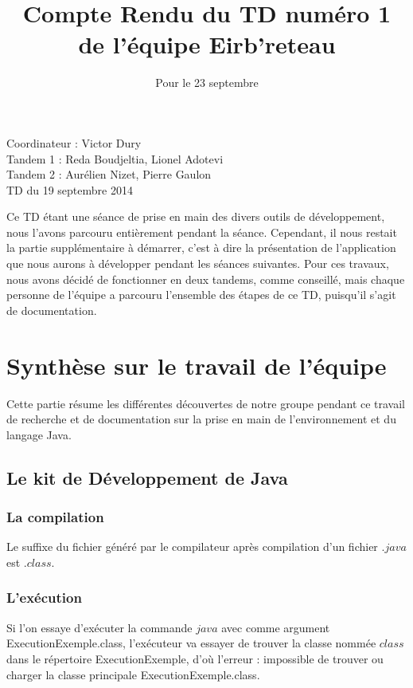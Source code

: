 \documentclass[a4paper,11pts]{article}
\begin{document}
\title{Compte Rendu du TD numéro 1 de l'équipe Eirb'reteau}
\date{Pour le 23 septembre}
\maketitle

\begin{center}
Coordinateur : Victor Dury\\
Tandem 1 : Reda Boudjeltia, Lionel Adotevi\\
Tandem 2 : Aurélien Nizet, Pierre Gaulon\\
TD du 19 septembre 2014
\end{center}

Ce TD étant une séance de prise en main des divers outils de développement, nous l'avons parcouru entièrement pendant la séance. Cependant, il nous restait la partie supplémentaire à démarrer, c'est à dire la présentation de l'application que nous aurons à développer pendant les séances suivantes. Pour ces travaux, nous avons décidé de fonctionner en deux tandems, comme conseillé, mais chaque personne de l'équipe a parcouru l'ensemble des étapes de ce TD, puisqu'il s'agit de documentation.

\section{Synthèse sur le travail de l'équipe}
Cette partie résume les différentes découvertes de notre groupe pendant ce travail de recherche et de documentation sur la prise en main de l'environnement et du langage Java.

\subsection{Le kit de Développement de Java}
\subsubsection{La compilation}
\indent Le suffixe du fichier généré par le compilateur après compilation d'un fichier $.java$ est $.class$.

\subsubsection{L'exécution}
\indent Si l'on essaye d'exécuter la commande $java$ avec comme argument ExecutionExemple.class, l'exécuteur va essayer de trouver la classe nommée $class$ dans le répertoire ExecutionExemple, d'où l'erreur : impossible de trouver ou charger la classe principale ExecutionExemple.class.
\end{document}
